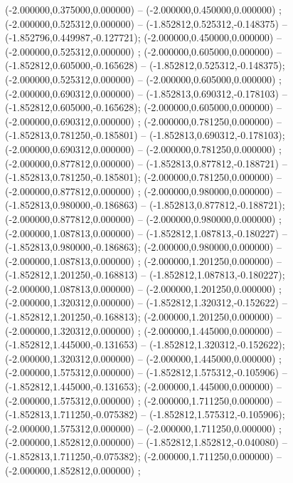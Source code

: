  (-2.000000,0.375000,0.000000) -- (-2.000000,0.450000,0.000000) ;
 (-2.000000,0.525312,0.000000) -- (-1.852812,0.525312,-0.148375) -- (-1.852796,0.449987,-0.127721);
 (-2.000000,0.450000,0.000000) -- (-2.000000,0.525312,0.000000) ;
 (-2.000000,0.605000,0.000000) -- (-1.852812,0.605000,-0.165628) -- (-1.852812,0.525312,-0.148375);
 (-2.000000,0.525312,0.000000) -- (-2.000000,0.605000,0.000000) ;
 (-2.000000,0.690312,0.000000) -- (-1.852813,0.690312,-0.178103) -- (-1.852812,0.605000,-0.165628);
 (-2.000000,0.605000,0.000000) -- (-2.000000,0.690312,0.000000) ;
 (-2.000000,0.781250,0.000000) -- (-1.852813,0.781250,-0.185801) -- (-1.852813,0.690312,-0.178103);
 (-2.000000,0.690312,0.000000) -- (-2.000000,0.781250,0.000000) ;
 (-2.000000,0.877812,0.000000) -- (-1.852813,0.877812,-0.188721) -- (-1.852813,0.781250,-0.185801);
 (-2.000000,0.781250,0.000000) -- (-2.000000,0.877812,0.000000) ;
 (-2.000000,0.980000,0.000000) -- (-1.852813,0.980000,-0.186863) -- (-1.852813,0.877812,-0.188721);
 (-2.000000,0.877812,0.000000) -- (-2.000000,0.980000,0.000000) ;
 (-2.000000,1.087813,0.000000) -- (-1.852812,1.087813,-0.180227) -- (-1.852813,0.980000,-0.186863);
 (-2.000000,0.980000,0.000000) -- (-2.000000,1.087813,0.000000) ;
 (-2.000000,1.201250,0.000000) -- (-1.852812,1.201250,-0.168813) -- (-1.852812,1.087813,-0.180227);
 (-2.000000,1.087813,0.000000) -- (-2.000000,1.201250,0.000000) ;
 (-2.000000,1.320312,0.000000) -- (-1.852812,1.320312,-0.152622) -- (-1.852812,1.201250,-0.168813);
 (-2.000000,1.201250,0.000000) -- (-2.000000,1.320312,0.000000) ;
 (-2.000000,1.445000,0.000000) -- (-1.852812,1.445000,-0.131653) -- (-1.852812,1.320312,-0.152622);
 (-2.000000,1.320312,0.000000) -- (-2.000000,1.445000,0.000000) ;
 (-2.000000,1.575312,0.000000) -- (-1.852812,1.575312,-0.105906) -- (-1.852812,1.445000,-0.131653);
 (-2.000000,1.445000,0.000000) -- (-2.000000,1.575312,0.000000) ;
 (-2.000000,1.711250,0.000000) -- (-1.852813,1.711250,-0.075382) -- (-1.852812,1.575312,-0.105906);
 (-2.000000,1.575312,0.000000) -- (-2.000000,1.711250,0.000000) ;
 (-2.000000,1.852812,0.000000) -- (-1.852812,1.852812,-0.040080) -- (-1.852813,1.711250,-0.075382);
 (-2.000000,1.711250,0.000000) -- (-2.000000,1.852812,0.000000) ;
